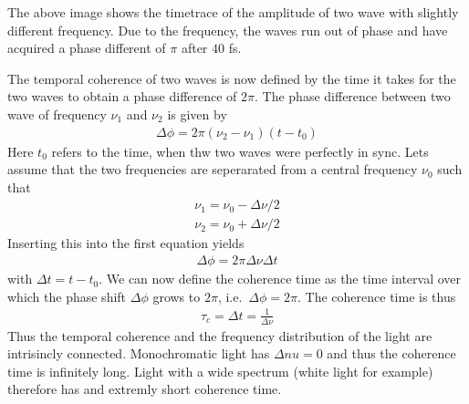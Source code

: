 \documentclass[letterpaper,10pt,english]{sphinxmanual}
\begin{document}
The above image shows the timetrace of the amplitude of two wave with slightly different frequency. Due to the frequency, the waves run out of phase and have acquired a phase different of \(\pi\) after \(40\) fs.

The temporal coherence of two waves is now defined by the time it takes for the two waves to obtain a phase difference of \(2\pi\). The phase difference between two wave of frequency \(\nu_1\) and \(\nu_2\) is given by
\begin{equation*}
\begin{split}\Delta \phi = 2\pi (\nu_2-\nu_1)(t-t_0)\end{split}
\end{equation*}
Here \(t_0\) refers to the time, when thw two waves were perfectly in sync. Lets assume that the two frequencies are seperarated from a central frequency \(\nu_0\) such that
\begin{equation*}
\begin{split}\nu_1=\nu_0-\Delta \nu/2\end{split}
\end{equation*}\begin{equation*}
\begin{split}\nu_2=\nu_0+\Delta \nu/2\end{split}
\end{equation*}
Inserting this into the first equation yields
\begin{equation*}
\begin{split}\Delta \phi = 2\pi \Delta \nu \Delta t\end{split}
\end{equation*}
with \(\Delta t=t-t_0\). We can now define the coherence time as the time interval over which the phase shift \(\Delta \phi\) grows to \(2\pi\), i.e. \(\Delta \phi=2\pi\). The coherence time is thus
\begin{equation*}
\begin{split}\tau_{c}=\Delta t =\frac{1}{\Delta \nu}\end{split}
\end{equation*}
Thus the temporal coherence and the frequency distribution of the light are intrisincly connected. Monochromatic light has \(\Delta nu=0\) and thus the coherence time is infinitely long. Light with a wide spectrum (white light for example) therefore has and extremly short coherence time.
\end{document}
